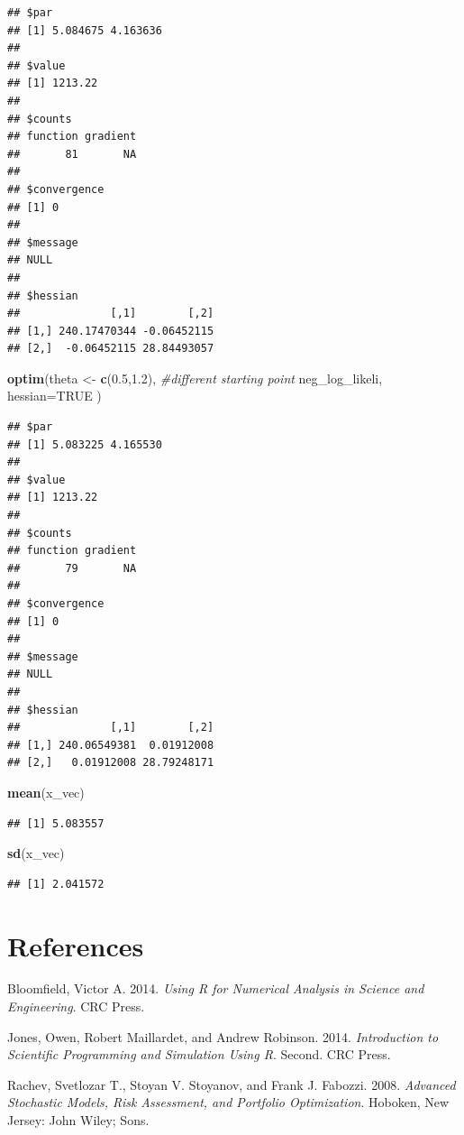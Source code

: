 \documentclass[11pt,]{article}
\newenvironment{Shaded}{\begin{snugshade}}{\end{snugshade}}
\newcommand{\KeywordTok}[1]{\textcolor[rgb]{0.13,0.29,0.53}{\textbf{#1}}}
\newcommand{\DataTypeTok}[1]{\textcolor[rgb]{0.13,0.29,0.53}{#1}}
\newcommand{\FloatTok}[1]{\textcolor[rgb]{0.00,0.00,0.81}{#1}}
\newcommand{\StringTok}[1]{\textcolor[rgb]{0.31,0.60,0.02}{#1}}
\newcommand{\CommentTok}[1]{\textcolor[rgb]{0.56,0.35,0.01}{\textit{#1}}}
\newcommand{\OtherTok}[1]{\textcolor[rgb]{0.56,0.35,0.01}{#1}}
\newcommand{\NormalTok}[1]{#1}
\begin{document}
\begin{verbatim}
## $par
## [1] 5.084675 4.163636
## 
## $value
## [1] 1213.22
## 
## $counts
## function gradient 
##       81       NA 
## 
## $convergence
## [1] 0
## 
## $message
## NULL
## 
## $hessian
##              [,1]        [,2]
## [1,] 240.17470344 -0.06452115
## [2,]  -0.06452115 28.84493057
\end{verbatim}

\begin{Shaded}
\begin{Highlighting}[]
\KeywordTok{optim}\NormalTok{(theta <-}\StringTok{ }\KeywordTok{c}\NormalTok{(}\FloatTok{0.5}\NormalTok{,}\FloatTok{1.2}\NormalTok{), }\CommentTok{#different starting point}
\NormalTok{      neg_log_likeli, }
      \DataTypeTok{hessian=}\OtherTok{TRUE}
\NormalTok{      ) }
\end{Highlighting}
\end{Shaded}

\begin{verbatim}
## $par
## [1] 5.083225 4.165530
## 
## $value
## [1] 1213.22
## 
## $counts
## function gradient 
##       79       NA 
## 
## $convergence
## [1] 0
## 
## $message
## NULL
## 
## $hessian
##              [,1]        [,2]
## [1,] 240.06549381  0.01912008
## [2,]   0.01912008 28.79248171
\end{verbatim}

\begin{Shaded}
\begin{Highlighting}[]
\KeywordTok{mean}\NormalTok{(x_vec)}
\end{Highlighting}
\end{Shaded}

\begin{verbatim}
## [1] 5.083557
\end{verbatim}

\begin{Shaded}
\begin{Highlighting}[]
\KeywordTok{sd}\NormalTok{(x_vec)}
\end{Highlighting}
\end{Shaded}

\begin{verbatim}
## [1] 2.041572
\end{verbatim}

\section*{References}\label{references}

\hypertarget{refs}{}
\hypertarget{ref-Bloomfield:2014}{}
Bloomfield, Victor A. 2014. \emph{Using R for Numerical Analysis in
Science and Engineering}. CRC Press.

\hypertarget{ref-Jones_et_al:2014}{}
Jones, Owen, Robert Maillardet, and Andrew Robinson. 2014.
\emph{Introduction to Scientific Programming and Simulation Using R}.
Second. CRC Press.

\hypertarget{ref-Rachev:2008}{}
Rachev, Svetlozar T., Stoyan V. Stoyanov, and Frank J. Fabozzi. 2008.
\emph{Advanced Stochastic Models, Risk Assessment, and Portfolio
Optimization}. Hoboken, New Jersey: John Wiley; Sons.
\end{document}
